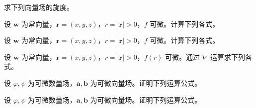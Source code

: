 \noindent\begin{minipage}{\textwidth}
求下列向量场的旋度。
\end{minipage}\par\vfill
\noindent\begin{minipage}{\textwidth}
设 $\boldsymbol w$ 为常向量，$\boldsymbol r=(x,y,z)$，$r=|\boldsymbol r|>0$，$f$ 可微。计算下列各式。
\end{minipage}\par\vfill
\noindent\begin{minipage}{\textwidth}
设 $\boldsymbol w$ 为常向量，$\boldsymbol r=(x,y,z)$，$r=|\boldsymbol r|>0$，$f$ 可微。计算下列各式。
\end{minipage}\par\vfill
\noindent\begin{minipage}{\textwidth}
设 $\boldsymbol w$ 为常向量，$\boldsymbol r=(x,y,z)$，$r=|\boldsymbol r|>0$，$f(r)$ 可微。通过 $\nabla$ 运算求下列各式。
\end{minipage}\par\vfill
\newpage
\noindent\begin{minipage}{\textwidth}
设 $\varphi,\psi$ 为可微数量场，$\boldsymbol a,\boldsymbol b$ 为可微向量场。证明下列运算公式。
\end{minipage}\par\vfill
\noindent\begin{minipage}{\textwidth}
设 $\varphi,\psi$ 为可微数量场，$\boldsymbol a,\boldsymbol b$ 为可微向量场。证明下列运算公式。
\end{minipage}\par\vfill
